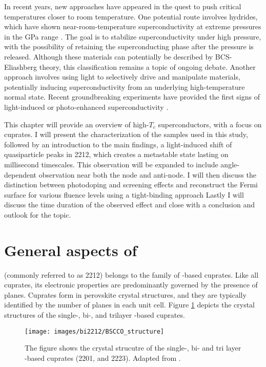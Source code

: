 In recent years, new approaches have appeared in the quest to push critical temperatures closer to room temperature.
One potential route involves hydrides, which have shown near-room-temperature superconductivity at extreme pressures in the \unit{\giga\pascal} range \cite{duan_structure_2017}.
The goal is to stabilize superconductivity under high pressure, with the possibility of retaining the superconducting phase after the pressure is released.
Although these materials can potentially be described by BCS-Eliashberg theory, this classification remains a topic of ongoing debate.
Another approach involves using light to selectively drive and manipulate materials, potentially inducing superconductivity from an underlying high-temperature normal state.
Recent groundbreaking experiments have provided the first signs of light-induced or photo-enhanced superconductivity \cite{fausti_light-induced_2011, buzzi_phase_2021, fava_magnetic_2024}.

This chapter will provide an overview of high-$T_c$ superconductors, with a focus on cuprates.
I will present the characterization of the samples used in this study, followed by an introduction to the main findings, a light-induced shift of quasiparticle peaks in 2212, which creates a metastable state lasting on millisecond timescales.
This observation will be expanded to include angle-dependent observation near both the node and anti-node.
I will then discuss the distinction between photodoping and screening effects and reconstruct the Fermi surface for various fluence levels using a tight-binding approach
Lastly I will discuss the time duration of the observed effect and close with a conclusion and outlook for the topic.

\section{General aspects of }
\label{sec:bscco_general}

 (commonly referred to as 2212) belongs to the family of -based cuprates.
Like all cuprates, its electronic properties are predominantly governed by the presence of  planes.
Cuprates form in perovskite crystal structures, and they are typically identified by the number of  planes in each unit cell.
Figure \ref{fig:bscco_structure} depicts the crystal structures of the single-, bi-, and trilayer -based cuprates.

\begin{figure}
	\centering
	\texttt{[image: images/bi2212/BSCCO\_structure]}
	\caption{The figure shows the crystal strucutre of the single-, bi- and tri layer -based cuprates  (2201,  and 2223). Adapted from \cite{nazargulov_english_2009}.}
	\label{fig:bscco_structure}
\end{figure}

